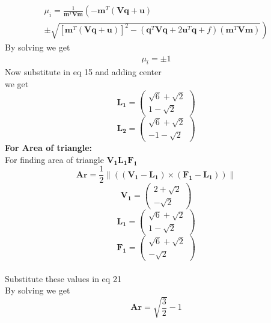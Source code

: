 \documentclass[10pt,a4paper]{report}
\newcommand{\myvec}[1]{\ensuremath{\begin{pmatrix}#1\end{pmatrix}}}
\providecommand{\norm}[1]{\left\lVert#1\right\rVert}
\providecommand{\brak}[1]{\ensuremath{\left(#1\right)}}
\providecommand{\lbrak}[1]{\ensuremath{\left(#1\right.}}
\providecommand{\rbrak}[1]{\ensuremath{\left.#1\right)}}
\providecommand{\sbrak}[1]{\ensuremath{{}\left[#1\right]}}
\let\vec\mathbf
\begin{document}
\begin{multicols}{2}
\begin{multline}
\mu_i = \frac{1}
{
\vec{m}^T\vec{V}\vec{m}
}
\lbrak{-\vec{m}^T\brak{\vec{V}\vec{q}+\vec{u}}}
\\
\pm
\rbrak{\sqrt{
\sbrak{
\vec{m}^T\brak{\vec{V}\vec{q}+\vec{u}}
}^2
-
\brak
{
\vec{q}^T\vec{V}\vec{q} + 2\vec{u}^T\vec{q} +f
}
\brak{\vec{m}^T\vec{V}\vec{m}}
}
}
\end{multline}
By solving we get 
\begin{align}
\mu_i=\pm 1
\end{align}
Now substitute in eq 15 and adding center 
\vspace{0.25cm}\\
we get
\vspace{0.25cm}\\
\begin{equation}
\vec{L_1} = \myvec{\sqrt{6}+\sqrt{2} \\ 1-\sqrt{2}}
\end{equation}
\begin{equation}
\vec{L_2} = \myvec{\sqrt{6}+\sqrt{2} \\ -1-\sqrt{2}}
\end{equation}
\textbf{For Area of triangle:}
\vspace{0.25cm}\\
For finding area of triangle $\vec{V_1}\vec{L_1}\vec{F_1}$
\begin{equation}
\vec{Ar}=\frac{1}{2}\norm{(\vec{(V_1-L_1)}\times\vec{(F_1-L_1)})}
\end{equation}
\begin{equation}
\vec{V_1} = \myvec{2+\sqrt{2} \\ -\sqrt{2}}
\end{equation}
\begin{equation}
\vec{L_1} = \myvec{\sqrt{6}+\sqrt{2} \\ 1-\sqrt{2}}
\end{equation}
\begin{equation}
\vec{F_1} = \myvec{\sqrt{6}+\sqrt{2} \\ -\sqrt{2}}
\end{equation}
\vspace{0.25cm}\\
Substitute these values in eq 21
\vspace{0.25cm}\\
By solving we get
\begin{equation}
 \boxed { \vec{Ar} = \sqrt{\frac{3}{2}} - 1}
\end{equation}
\end{multicols}
\end{document}
